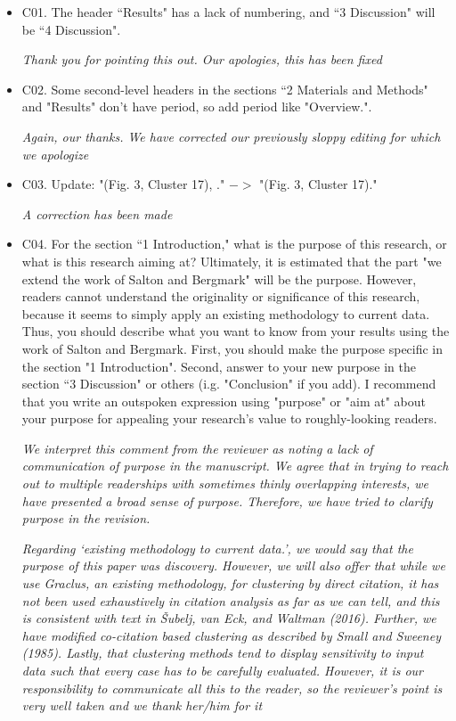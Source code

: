 \documentclass[11pt, oneside]{article}   	%
\begin{document}
\begin{itemize}    
\item C01. The header ``Results" has a lack of numbering, and ``3 Discussion" will be ``4 Discussion".

\emph{Thank you for pointing this out. Our apologies, this has been fixed}
        
\item    C02. Some second-level headers in the sections ``2 Materials and Methods" and "Results" don't have period, so add period like "Overview.".

\emph{ Again, our thanks. We have corrected our previously sloppy editing for which we apologize} 
 
\item C03. Update: "(Fig. 3, Cluster 17), ." $->$ "(Fig. 3, Cluster 17)."
    
\emph{A correction has been made} 

\item C04. For the section ``1 Introduction," what is the purpose of this research, or what is this research aiming at? Ultimately, it is estimated that the part "we extend the work of Salton and Bergmark" will be the purpose. 
However, readers cannot understand the originality or significance of this research, because it seems to simply apply an existing methodology to current data. Thus, you should describe what you want to know from your 
results using the work of Salton and Bergmark. First, you should make the purpose specific in the section "1 Introduction". Second, answer to your new purpose in the section ``3 Discussion" or others (i.g. "Conclusion" if you add).
I recommend that you write an outspoken expression using "purpose" or "aim at" about your purpose for appealing your research's value to roughly-looking readers.

\emph{We interpret this comment from the reviewer as noting a lack of communication of purpose in the manuscript. We agree that in trying to reach out to multiple readerships with sometimes thinly overlapping interests, we have 
presented a broad sense of purpose. Therefore, we have tried to clarify purpose in the revision.} 

\emph{Regarding `existing methodology to current data.', we would say that the purpose of this paper was discovery. However, we will also offer that while we use Graclus, an existing methodology, for clustering by direct citation, it has not been used exhaustively in citation analysis as far as we can tell, and this is consistent with text in \v{S}ubelj, van Eck, and Waltman (2016). Further, we have modified co-citation based clustering as described by Small and Sweeney (1985). Lastly, that clustering methods tend to display sensitivity to input data such that every case has to be carefully evaluated. However, it is our responsibility to communicate all this to the reader, so the reviewer's point is very well taken and we thank her/him for it}


\end{itemize}
\end{document}
